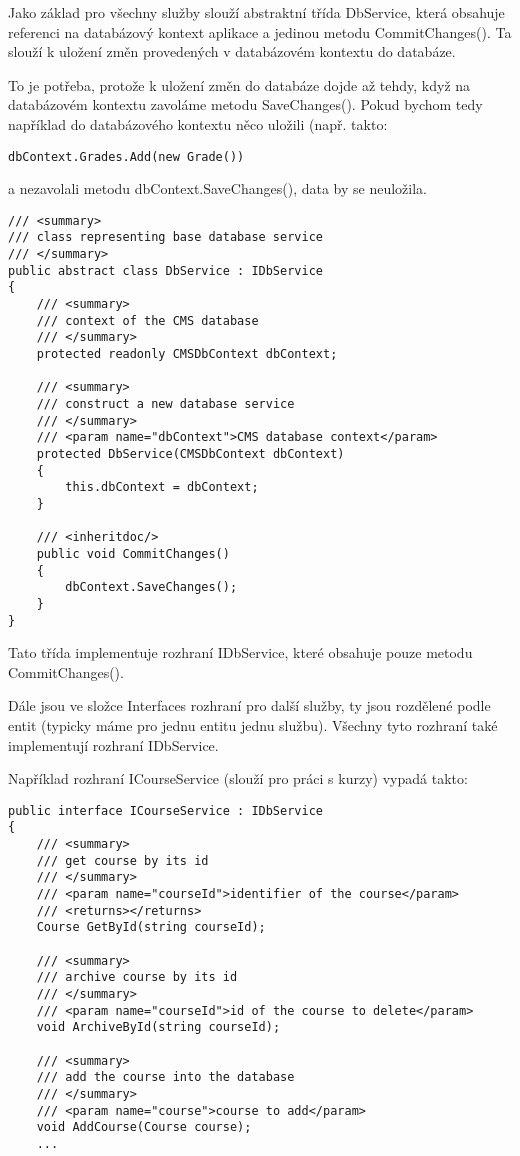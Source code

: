 Jako základ pro všechny služby slouží abstraktní třída DbService, která obsahuje referenci na databázový kontext aplikace a jedinou metodu CommitChanges(). Ta slouží k uložení změn provedených v databázovém kontextu do databáze. 

To je potřeba, protože k uložení změn do databáze dojde až tehdy, když na databázovém kontextu zavoláme metodu SaveChanges(). Pokud bychom tedy například do databázového kontextu něco uložili (např. takto: 
\begin{lstlisting}
dbContext.Grades.Add(new Grade())
\end{lstlisting}
a nezavolali metodu dbContext.SaveChanges(), data by se neuložila.

\begin{lstlisting}
/// <summary>
/// class representing base database service
/// </summary>
public abstract class DbService : IDbService
{
	/// <summary>
	/// context of the CMS database
	/// </summary>
	protected readonly CMSDbContext dbContext;
	
	/// <summary>
	/// construct a new database service
	/// </summary>
	/// <param name="dbContext">CMS database context</param>
	protected DbService(CMSDbContext dbContext)
	{
		this.dbContext = dbContext;
	}
	
	/// <inheritdoc/>
	public void CommitChanges()
	{
		dbContext.SaveChanges();
	}
}
\end{lstlisting}

Tato třída implementuje rozhraní IDbService, které obsahuje pouze metodu CommitChanges().

Dále jsou ve složce Interfaces rozhraní pro další služby, ty jsou rozdělené podle entit (typicky máme pro jednu entitu jednu službu). Všechny tyto rozhraní také implementují rozhraní IDbService. 

Například rozhraní ICourseService (slouží pro práci s kurzy) vypadá takto:
\begin{lstlisting}
public interface ICourseService : IDbService
{
	/// <summary>
	/// get course by its id
	/// </summary>
	/// <param name="courseId">identifier of the course</param>
	/// <returns></returns>
	Course GetById(string courseId);
	
	/// <summary>
	/// archive course by its id
	/// </summary>
	/// <param name="courseId">id of the course to delete</param>
	void ArchiveById(string courseId);
	
	/// <summary>
	/// add the course into the database
	/// </summary>
	/// <param name="course">course to add</param>
	void AddCourse(Course course);
	...
\end{lstlisting}

